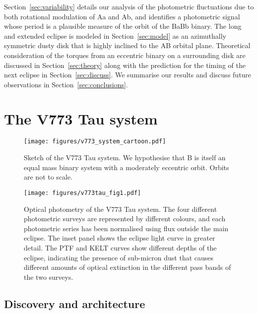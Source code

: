 \documentclass{aa}
\begin{document}
Section~\ref{sec:variability} details our analysis of the photometric fluctuations due to both rotational modulation of Aa and Ab, and identifies a photometric signal whose period is a plausible measure of the orbit of the BaBb binary.
%
The long and extended eclipse is modeled in Section~\ref{sec:model} as an azimuthally symmetric dusty disk that is highly inclined to the AB orbital plane.
%
Theoretical consideration of the torques from an eccentric binary on a surrounding disk are discussed in Section~\ref{sec:theory} along with the prediction for the timing of the next eclipse in Section~\ref{sec:discuss}.
%
We summarise our results and discuss future observations in Section~\ref{sec:conclusions}.

\section{The V773 Tau system}\label{sec:v773}

\begin{figure}
\begin{center}
    \centering
    \texttt{[image: figures/v773\_system\_cartoon.pdf]}
    \caption{Sketch of the V773 Tau system. 
    We hypothesise that B is itself an equal mass binary system with a moderately eccentric orbit.
    Orbits are not to scale.}
\label{fig:cartoon}
\end{center}
\end{figure}

\begin{figure*}
\begin{center}
    \centering
    \texttt{[image: figures/v773tau\_fig1.pdf]}
    \caption{Optical photometry of the V773 Tau system.
    The four different photometric surveys are represented by different colours, and each photometric series has been normalised using flux outside the main eclipse.
    The inset panel shows the eclipse light curve in greater detail.
    The PTF and KELT curves show different depths of the eclipse, indicating the presence of sub-micron dust that causes different amounts of optical extinction in the different pass bands of the two surveys.}
\label{fig:lc}
\end{center}
\end{figure*}

\subsection{Discovery and architecture}
\end{document}
